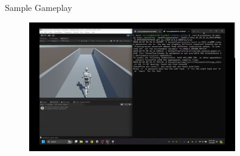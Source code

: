\begin{frame}{Sample Gameplay}
    \begin{figure}[htpb!]
        \centering
        \href{https://youtu.be/3T2kwwnvs3c}{%
        \includegraphics[width=0.8\textwidth]{figures/gameplay/thesisGameplayThumbnail}%
        }
    \end{figure}
\end{frame}